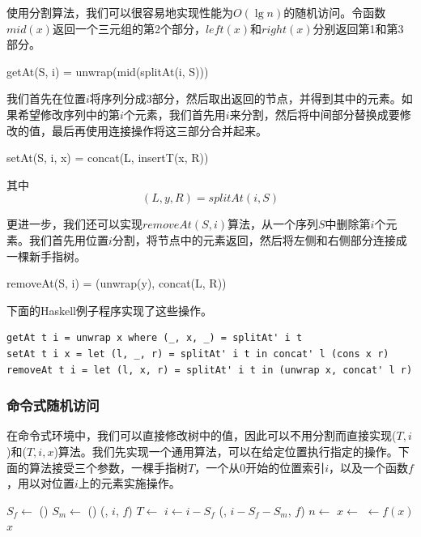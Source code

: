 \documentclass[b5paper]{ctexart}
\begin{document}
使用分割算法，我们可以很容易地实现性能为$O(\lg n)$的随机访问。令函数$mid(x)$返回一个三元组的第2个部分，$left(x)$和$right(x)$分别返回第1和第3部分。

\be
getAt(S, i) = unwrap(mid(splitAt(i, S)))
\ee

我们首先在位置$i$将序列分成3部分，然后取出返回的节点，并得到其中的元素。如果希望修改序列中的第$i$个元素，我们首先用$i$来分割，然后将中间部分替换成要修改的值，最后再使用连接操作将这三部分合并起来。

\be
setAt(S, i, x) = concat(L, insertT(x, R))
\ee

其中
\[
(L, y, R) = splitAt(i, S)
\]

更进一步，我们还可以实现$removeAt(S, i)$算法，从一个序列$S$中删除第$i$个元素。我们首先用位置$i$分割，将节点中的元素返回，然后将左侧和右侧部分连接成一棵新手指树。

\be
removeAt(S, i) = (unwrap(y), concat(L, R))
\ee

下面的Haskell例子程序实现了这些操作。

\lstset{language=Haskell}
\begin{lstlisting}[style=Haskell]
getAt t i = unwrap x where (_, x, _) = splitAt' i t
setAt t i x = let (l, _, r) = splitAt' i t in concat' l (cons x r)
removeAt t i = let (l, x, r) = splitAt' i t in (unwrap x, concat' l r)
\end{lstlisting}

\subsubsection{命令式随机访问}

在命令式环境中，我们可以直接修改树中的值，因此可以不用分割而直接实现($T, i$)和($T, i, x$)算法。我们先实现一个通用算法，可以在给定位置执行指定的操作。下面的算法接受三个参数，一棵手指树$T$，一个从0开始的位置索引$i$，以及一个函数$f$，用以对位置$i$上的元素实施操作。

\begin{algorithmic}
    \State $S_f \gets $ ()
    \State $S_m \gets $ ()
      \State \Return {}(, $i$, $f$)
      \State $T \gets$ 
      \State $i \gets i - S_f$
    \Else
      \State \Return {}(, $i - S_f - S_m$, $f$)
    \EndIf
  \EndWhile
  \State $n \gets$ 
  \State $x \gets$ 
  \State {} $\gets f(x)$
  \State \Return $x$
\EndFunction
\end{algorithmic}
\end{document}
